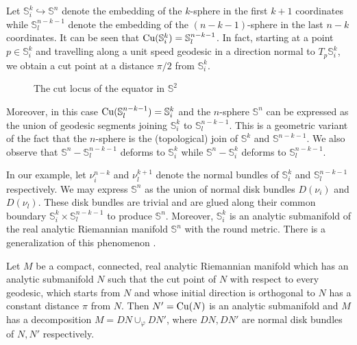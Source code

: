 \begin{eg}\label{join}
    Let $\mathbb{S}_i^k \hookrightarrow \mathbb{S}^n$ denote the embedding of the $k$-sphere in the first $k+1$ coordinates while $\mathbb{S}^{n-k-1}_l$ denote the embedding of the $(n-k-1)$-sphere in the last $n-k$ coordinates. It can be seen that $\textup{Cu}(\mathbb{S}_i^k)=\mathbb{S}_l^{n-k-1}$. In fact, starting at a point $p\in \mathbb{S}^k_i$ and travelling along a unit speed geodesic in a direction normal to $T_p\mathbb{S}^k_i$, we obtain a cut point at a distance $\pi/2$ from $\mathbb{S}^k_i$.
    \begin{figure}[!htpb]
        \centering
        \caption{The cut locus of the equator in $\mathbb{S}^2$\label{fig:S2_equator_cutlocus}}
    \end{figure}
    
    \hf Moreover, in this case $\textup{Cu}(\mathbb{S}_l^{n-k-1})=\mathbb{S}_i^{k}$ and the $n$-sphere $\mathbb{S}^n$ can be expressed as the union of geodesic segments joining $\mathbb{S}_i^k$ to $\mathbb{S}_l^{n-k-1}$. This is a geometric variant of the fact that the $n$-sphere is the (topological) join of $\mathbb{S}^k$ and $\mathbb{S}^{n-k-1}$. We also observe that $\mathbb{S}^n - \mathbb{S}_l^{n-k-1}$ deforms to $\mathbb{S}_i^k$ while $\mathbb{S}^n - \mathbb{S}_i^{k}$ deforms to $\mathbb{S}_l^{n-k-1}$. 
    
    \hf In our example, let $\nu_i^{n-k}$ and $\nu_l^{k+1}$ denote the normal bundles of $\mathbb{S}_i^k$ and $\mathbb{S}_l^{n-k-1}$ respectively. We may express $\mathbb{S}^n$ as the union of normal disk bundles $D(\nu_i)$ and $D(\nu_l)$. These disk bundles are trivial and are glued along their common boundary $\mathbb{S}^k_i\times \mathbb{S}_l^{n-k-1}$ to produce $\mathbb{S}^n$. Moreover, $\mathbb{S}^k_i$ is an analytic submanifold of the real analytic Riemannian manifold $\mathbb{S}^n$ with the round metric. There is a generalization of this phenomenon  \cite[Lemmas 1.3-1.5, Theorem 3.1]{Omo68}.
    \begin{thm}[Omori 1968]
        Let $M$ be a compact, connected, real analytic Riemannian manifold which has an analytic submanifold $N$ such that the cut  point of $N$ with respect to every geodesic, which starts from $N$ and whose initial  direction is orthogonal to $N$ has a constant distance $\pi$ from $N$. Then $N'=\mathrm{Cu}(N)$ is an analytic submanifold and $M$ has a decomposition $M = DN\cup_{\varphi} DN'$, where $DN,  DN'$ are normal disk bundles of $N, N'$ respectively.
    \end{thm}
\end{eg}

